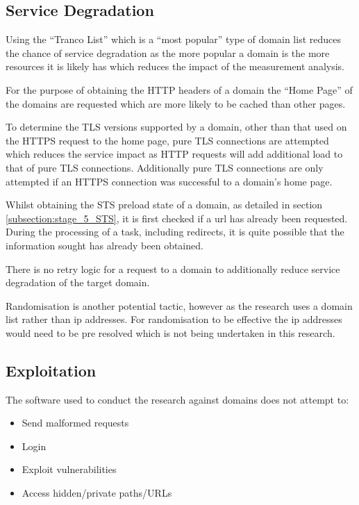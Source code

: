 \documentclass{mscreport}
\begin{document}
\subsection{Service Degradation}

Using the ``Tranco List'' which is a ``most popular'' type of domain list reduces the chance of service degradation as the more popular a domain is the more resources it is likely has which reduces the impact of the measurement analysis.

\vspace{0.3cm} \noindent
For the purpose of obtaining the HTTP headers of a domain the ``Home Page'' of the domains are requested which are more likely to be cached than other pages.

\vspace{0.3cm} \noindent
To determine the TLS versions supported by a domain, other than that used on the HTTPS request to the home page, pure TLS connections are attempted which reduces the service impact as HTTP requests will add additional load to that of pure TLS connections. Additionally pure TLS connections are only attempted if an HTTPS connection was successful to a domain's home page.

\vspace{0.3cm} \noindent
Whilst obtaining the STS preload state of a domain, as detailed in section \ref{subsection:stage_5_STS}, it is first checked if a url has already been requested. During the processing of a task, including redirects, it is quite possible that the information sought has already been obtained.

\vspace{0.3cm} \noindent
There is no retry logic for a request to a domain to additionally reduce service degradation of the target domain.

\vspace{0.3cm} \noindent
Randomisation is another potential tactic, however as the research uses a domain list rather than ip addresses. For randomisation to be effective the ip addresses would need to be pre resolved which is not being undertaken in this research.

\subsection{Exploitation}

The software used to conduct the research against domains does not attempt to:

\begin{itemize}
	\setlength\itemsep{0.1em}
    \item Send malformed requests
    \item Login
    \item Exploit vulnerabilities
    \item Access hidden/private paths/URLs
\end{itemize}
\end{document}
